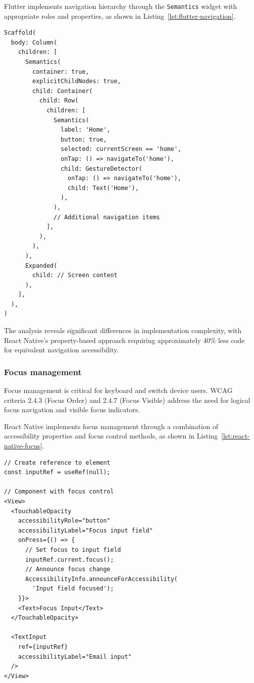 Flutter implements navigation hierarchy through the \texttt{Semantics} widget with appropriate roles and properties, as shown in Listing~\ref{lst:flutter-navigation}.

\begin{lstlisting}[style=DartStyle, caption=Navigation hierarchy in Flutter, label=lst:flutter-navigation]
Scaffold(
  body: Column(
    children: [
      Semantics(
        container: true,
        explicitChildNodes: true,
        child: Container(
          child: Row(
            children: [
              Semantics(
                label: 'Home',
                button: true,
                selected: currentScreen == 'home',
                onTap: () => navigateTo('home'),
                child: GestureDetector(
                  onTap: () => navigateTo('home'),
                  child: Text('Home'),
                ),
              ),
              // Additional navigation items
            ],
          ),
        ),
      ),
      Expanded(
        child: // Screen content
      ),
    ],
  ),
)
\end{lstlisting}

The analysis reveals significant differences in implementation complexity, with React Native's property-based approach requiring approximately 40\% less code for equivalent navigation accessibility.

\pagebreak

\subsubsection{Focus management}
\label{subsubsec:focus-management}

Focus management is critical for keyboard and switch device users. WCAG criteria 2.4.3 (Focus Order) and 2.4.7 (Focus Visible) address the need for logical focus navigation and visible focus indicators.

React Native implements focus management through a combination of accessibility properties and focus control methods, as shown in Listing~\ref{lst:react-native-focus}.

\begin{lstlisting}[style=ReactNativeStyle, caption=Focus management in React Native, label=lst:react-native-focus]
// Create reference to element
const inputRef = useRef(null);

// Component with focus control
<View>
  <TouchableOpacity
    accessibilityRole="button"
    accessibilityLabel="Focus input field"
    onPress={() => {
      // Set focus to input field
      inputRef.current.focus();
      // Announce focus change
      AccessibilityInfo.announceForAccessibility(
        'Input field focused');
    }}>
    <Text>Focus Input</Text>
  </TouchableOpacity>
  
  <TextInput
    ref={inputRef}
    accessibilityLabel="Email input"
  />
</View>
\end{lstlisting}

